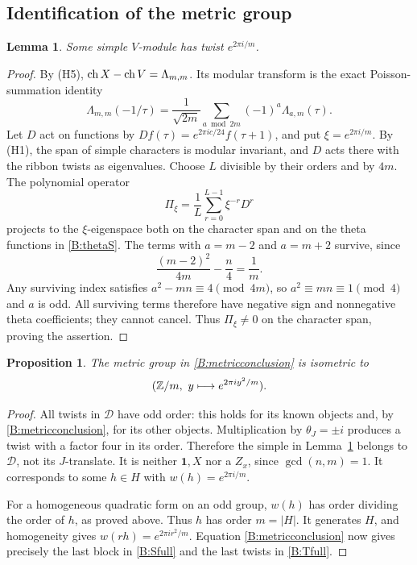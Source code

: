 \documentclass[11pt]{article}
\newtheorem{lemma}[theorem]{Lemma}
\newtheorem{proposition}[theorem]{Proposition}
\newcommand{\one}{\mathbf1}\newcommand{\D}{\mathcal D}\newcommand{\Dcat}{\mathcal D}
\numberwithin{equation}{section}
\begin{document}
\subsection{Identification of the metric group}
\begin{lemma}\label{B:primitive}
Some simple $V$-module has twist $e^{2\pi i/m}$.
\end{lemma}
\begin{proof}
By (H5), $\operatorname{ch} X-\operatorname{ch} V=\Lambda_{m,m}$. Its modular transform is the exact Poisson-summation identity
\begin{equation}\label{B:thetaS}
 \Lambda_{m,m}(-1/\tau)=\frac1{\sqrt{2m}}
             \sum_{a\bmod2m}(-1)^a\Lambda_{a,m}(\tau).
\end{equation}
Let $D$ act on functions by $Df(\tau)=e^{2\pi ic/24}f(\tau+1)$, and put $\xi=e^{2\pi i/m}$. By (H1), the span of simple characters is modular invariant, and $D$ acts there with the ribbon twists as eigenvalues. Choose $L$ divisible by their orders and by $4m$. The polynomial operator
\[
 \Pi_\xi=\frac1L\sum_{r=0}^{L-1}\xi^{-r}D^r
\]
projects to the $\xi$-eigenspace both on the character span and on the theta functions in \eqref{B:thetaS}. The terms with $a=m-2$ and $a=m+2$ survive, since
\[
 \frac{(m-2)^2}{4m}-\frac n4=\frac1m.
\]
Any surviving index satisfies $a^2-mn\equiv4\pmod{4m}$, so $a^2\equiv mn\equiv1\pmod4$ and $a$ is odd. All surviving terms therefore have negative sign and nonnegative theta coefficients; they cannot cancel. Thus $\Pi_\xi\ne0$ on the character span, proving the assertion.
\end{proof}

\begin{proposition}\label{B:cyclicmetric}
The metric group in \eqref{B:metricconclusion} is isometric to
\[
 (\mathbb Z/m,\ y\longmapsto e^{2\pi iy^2/m}).
\]
\end{proposition}
\begin{proof}
All twists in $\D$ have odd order: this holds for its known objects and, by \eqref{B:metricconclusion}, for its other objects. Multiplication by $\theta_J=\pm i$ produces a twist with a factor four in its order. Therefore the simple in Lemma~\ref{B:primitive} belongs to $\D$, not its $J$-translate. It is neither $\one,X$ nor a $Z_x$, since $\gcd(n,m)=1$. It corresponds to some $h\in H$ with $w(h)=e^{2\pi i/m}$.

For a homogeneous quadratic form on an odd group, $w(h)$ has order dividing the order of $h$, as proved above. Thus $h$ has order $m=|H|$. It generates $H$, and homogeneity gives $w(rh)=e^{2\pi ir^2/m}$. Equation \eqref{B:metricconclusion} now gives precisely the last block in \eqref{B:Sfull} and the last twists in \eqref{B:Tfull}.
\end{proof}
\end{document}
